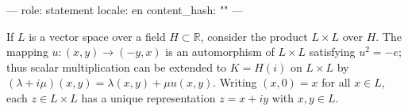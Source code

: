 ---
role: statement
locale: en
content_hash: ""
---

If $L$ is a vector space over a field $H \subset \mathbb{R}$, consider the product $L \times L$ over $H$. The mapping $u: (x, y) \rightarrow (-y, x)$ is an automorphism of $L \times L$ satisfying $u^2 = -e$; thus scalar multiplication can be extended to $K = H(i)$ on $L \times L$ by $(\lambda + i\mu)(x, y) = \lambda(x, y) + \mu u(x, y)$. Writing $(x, 0) = x$ for all $x \in L$, each $z \in L \times L$ has a unique representation $z = x + iy$ with $x, y \in L$.
